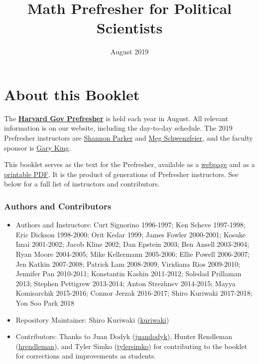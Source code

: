 \documentclass[]{book}
\title{Math Prefresher for Political Scientists}
\author{}
\date{August 2019}
\providecommand{\tightlist}{%
  \setlength{\itemsep}{0pt}\setlength{\parskip}{0pt}}
\theoremstyle{definition}
\theoremstyle{definition}
\theoremstyle{definition}
\theoremstyle{remark}
\begin{document}
\maketitle

{
\setcounter{tocdepth}{1}
\tableofcontents
}
\chapter*{About this Booklet}\label{about-this-booklet}

The \href{https://projects.iq.harvard.edu/prefresher}{\textbf{Harvard
Gov Prefresher}} is held each year in August. All relevant information
is on our website, including the day-to-day schedule. The 2019
Prefresher instructors are
\href{https://wcfia.harvard.edu/shannon-lynn-parker}{Shannon Parker} and
\href{http://schwenzfeier.github.io/}{Meg Schwenzfeier}, and the faculty
sponsor is \href{https://gking.harvard.edu}{Gary King}.

This booklet serves as the text for the Prefresher, available as a
\href{https://iqss.github.io/prefresher/}{webpage} and as a
\href{https://github.com/IQSS/prefresher/releases}{printable PDF}. It is
the product of generations of Prefresher instructors. See below for a
full list of instructors and contributors.

\subsection*{Authors and Contributors}\label{authors-and-contributors}

\begin{itemize}
\tightlist
\item
  Authors and Instructors: Curt Signorino 1996-1997; Ken Scheve
  1997-1998; Eric Dickson 1998-2000; Orit Kedar 1999; James Fowler
  2000-2001; Kosuke Imai 2001-2002; Jacob Kline 2002; Dan Epstein 2003;
  Ben Ansell 2003-2004; Ryan Moore 2004-2005; Mike Kellermann 2005-2006;
  Ellie Powell 2006-2007; Jen Katkin 2007-2008; Patrick Lam 2008-2009;
  Viridiana Rios 2009-2010; Jennifer Pan 2010-2011; Konstantin Kashin
  2011-2012; Soledad Prillaman 2013; Stephen Pettigrew 2013-2014; Anton
  Strezhnev 2014-2015; Mayya Komisarchik 2015-2016; Connor Jerzak
  2016-2017; Shiro Kuriwaki 2017-2018; Yon Soo Park 2018
\item
  Repository Maintainer: Shiro Kuriwaki
  (\href{https://github.com/kuriwaki}{kuriwaki})
\item
  Contributors: Thanks to Juan Dodyk
  (\href{https://github.com/juandodyk}{juandodyk}), Hunter Rendleman
  (\href{https://github.com/hrendleman}{hrendleman}), and Tyler Simko
  (\href{https://github.com/tylersimko}{tylersimko}) for contributing to
  the booklet for corrections and improvements as students.
\end{itemize}
\end{document}
